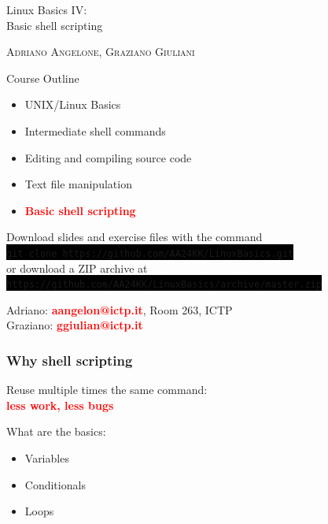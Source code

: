 \documentclass[unknownkeysallowed, 10pt, a4 paper, handout]{beamer}
\newcommand{\focus}[1]{\textbf{\textcolor{red}{#1}}}
\newcommand{\code}[1]{\colorbox{black}{\color{green}\texttt{#1}}}
\begin{document}
\begin{frame}
  \begin{center}


    \begin{block}{}
      \Large
      \centering
      Linux Basics IV:\\
      Basic shell scripting
    \end{block}

    \vspace{6mm}
    \large
    \textsc{Adriano Angelone, Graziano Giuliani} \\

  \end{center}
\end{frame}

\begin{frame}[label=outline]{Course Outline}
  \begin{itemize}
    \item UNIX/Linux Basics
    \item Intermediate shell commands
    \item Editing and compiling source code
    \item Text file manipulation
    \item \focus{Basic shell scripting}
  \end{itemize}

  \vspace{6mm}

  \centering
  Download slides and exercise files with the command\\
  \code{git clone https://github.com/AA24KK/LinuxBasics.git}\\
  \vspace{1mm}
  or download a ZIP archive at
  \vspace{1mm}
  \code{https://github.com/AA24KK/LinuxBasics/archive/master.zip}

  \vspace{2mm}

  Adriano: \focus{aangelon@ictp.it}, Room 263, ICTP\\
  Graziano: \focus{ggiulian@ictp.it}

\end{frame}

\begin{frame}
  \begin{center}
    \frametitle{Why shell scripting}

    Reuse multiple times the same command:\\
    \focus{less work, less bugs}

    What are the basics:
    \begin{itemize}
      \item Variables
      \item Conditionals
      \item Loops
    \end{itemize}
  \end{center}
\end{frame}
\end{document}
